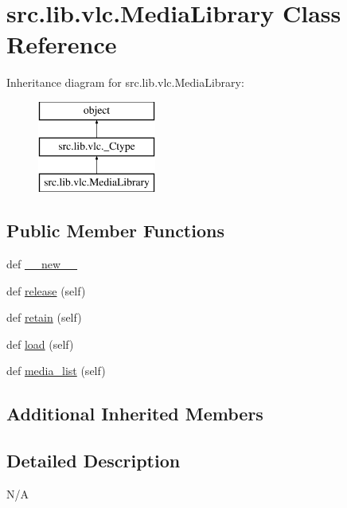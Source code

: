 \hypertarget{classsrc_1_1lib_1_1vlc_1_1MediaLibrary}{}\section{src.\+lib.\+vlc.\+Media\+Library Class Reference}
\label{classsrc_1_1lib_1_1vlc_1_1MediaLibrary}
Inheritance diagram for src.\+lib.\+vlc.\+Media\+Library\+:\begin{figure}[H]
\begin{center}
\leavevmode
\includegraphics[height=3.000000cm]{classsrc_1_1lib_1_1vlc_1_1MediaLibrary}
\end{center}
\end{figure}
\subsection*{Public Member Functions}
\begin{DoxyCompactItemize}
\item 
def \hyperlink{classsrc_1_1lib_1_1vlc_1_1MediaLibrary_aa659fb06dfc21a3b32fb24b89b6945ce}{\+\_\+\+\_\+new\+\_\+\+\_\+}
\item 
def \hyperlink{classsrc_1_1lib_1_1vlc_1_1MediaLibrary_ac18b86460e74aad8ea0dd2638d4aa192}{release} (self)
\item 
def \hyperlink{classsrc_1_1lib_1_1vlc_1_1MediaLibrary_aeeb6d487de70cefee36b6111a0ee060f}{retain} (self)
\item 
def \hyperlink{classsrc_1_1lib_1_1vlc_1_1MediaLibrary_aaad3a742a689db758b6f09bcb583092c}{load} (self)
\item 
def \hyperlink{classsrc_1_1lib_1_1vlc_1_1MediaLibrary_a69b0be01ac5ab728631b1c7c630862e5}{media\+\_\+list} (self)
\end{DoxyCompactItemize}
\subsection*{Additional Inherited Members}


\subsection{Detailed Description}
\begin{DoxyVerb}N/A
\end{DoxyVerb}
 


